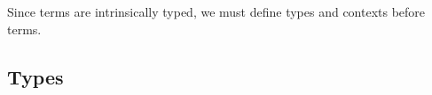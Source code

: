 \begin{fence}
\begin{code}%
\>[0]%
\>[7]\AgdaSpace{}%
\<%
\\
\>[0]%
\>[7]\AgdaSpace{}%
\<%
\\
\>[0]\AgdaSpace{}%
\AgdaSpace{}%
\AgdaOperator{\AgdaInductiveConstructor{\AgdaUnderscore{},\AgdaUnderscore{}}}\<%
\\
%
\\[\AgdaEmptyExtraSkip]%
\>[0]\AgdaSpace{}%
\AgdaSpace{}%
\<%
\\
%
\\[\AgdaEmptyExtraSkip]%
\>[0]%
\>[7]\AgdaSpace{}%
\<%
\\
\>[0]%
\>[7]\AgdaSpace{}%
\<%
\\
\>[0]\AgdaSpace{}%
\AgdaSpace{}%
\<%
\\
\>[0]%
\>[7]\AgdaSpace{}%
\<%
\\
\>[0]%
\>[7]\AgdaSpace{}%
\<%
\\
\>[0]%
\>[7]\AgdaSpace{}%
\<%
\\
\>[0]%
\>[7]\AgdaSpace{}%
\AgdaOperator{\AgdaFunction{\#\AgdaUnderscore{}}}\<%
\end{code}
\end{fence}

Since terms are intrinsically typed, we must define types and contexts
before terms.

\hypertarget{types}{%
\subsection{Types}\label{types}}

